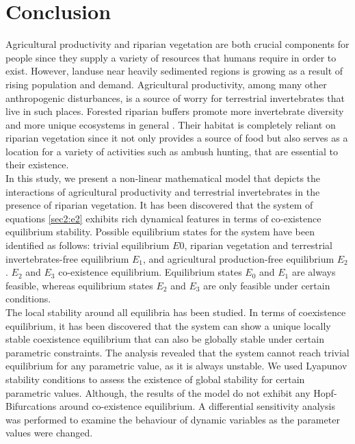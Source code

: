 \documentclass[12pt]{article}
\numberwithin{equation}{section}
\begin{document}
\section{Conclusion}
 Agricultural productivity and riparian vegetation are both crucial components for people since they supply a variety of resources that humans require in order to exist. However, landuse near heavily sedimented regions is growing as a result of rising population and demand. Agricultural productivity, among many other anthropogenic disturbances, is a source of worry for terrestrial invertebrates that live in such places. Forested riparian buffers promote more invertebrate diversity and more unique ecosystems in general \cite{popescu2021riparian}. Their habitat is completely reliant on riparian vegetation since it not only provides a source of food but also serves as a location for a variety of activities such as ambush hunting, that are essential to their existence.\\
In this study, we present a non-linear mathematical model that depicts the interactions of agricultural productivity and terrestrial invertebrates in the presence of riparian vegetation. It has been discovered that the system of equations \eqref{sec2:e2} exhibits rich dynamical features in terms of co-existence equilibrium stability. Possible equilibrium states for the system have been identified as follows: trivial equilibrium $E 0$, riparian vegetation and terrestrial invertebrates-free equilibrium $E_1$, and agricultural production-free equilibrium $E_2$. $E_2$ and $E_3$ co-existence equilibrium. Equilibrium states $E_0$ and $E_1$ are always feasible, whereas equilibrium states $E_2$ and $E_3$ are only feasible under certain conditions.\\
The local stability around all equilibria has been studied. In terms of coexistence equilibrium, it has been discovered that the system can show a unique locally stable coexistence equilibrium that can also be globally stable under certain parametric constraints. The analysis revealed that the system cannot reach trivial equilibrium for any parametric value, as it is always unstable. We used Lyapunov stability conditions to assess the existence of global stability for certain parametric values. Although, the results of the model do not exhibit any Hopf-Bifurcations around co-existence equilibrium. A differential sensitivity analysis was performed to examine the behaviour of dynamic variables as the parameter values were changed.\\
\end{document}
